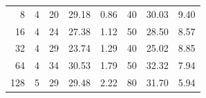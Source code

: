 \begin{table}[h!]
\begin{tabular}{rrrrrrrr}
8                      & 4                          & 20                     & 29.18                                                                             & 0.86                                                                            & 40                                                                                  & 30.03                                                                            & 9.40                                                                           \\
16                     & 4                          & 24                     & 27.38                                                                             & 1.12                                                                            &
50                                                                                  & 28.50                                                                            & 8.57                                                                           \\
32                     & 4                          & 29                     & 23.74                                                                             & 1.29                                                                            & 40                                                                                  & 25.02                                                                            & 8.85                                                                           \\
64                     & 4                          & 34                     & 30.53                                                                             & 1.79                                                                            & 50                                                                                  & 32.32                                                                            & 7.94                                                                           \\
128                    & 5                          & 29                     & 29.48                                                                             & 2.22                                                                            & 80                                                                                  & 31.70                                                                            & 5.94                                                                          
\end{tabular}
\end{table}




